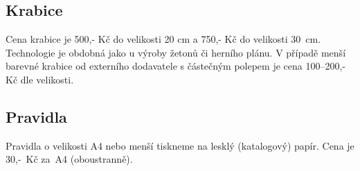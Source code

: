 \documentclass[14pt,a4paper]{extarticle}
\begin{document}
\subsection*{Krabice}
Cena krabice je 500,- Kč do velikosti 20 cm a 750,- Kč do velikosti 30~cm. Technologie je obdobná jako u výroby žetonů či herního plánu. V případě menší barevné krabice od externího dodavatele s částečným
polepem je cena 100--200,- Kč dle velikosti.
\subsection*{Pravidla}
Pravidla o velikosti A4 nebo menší tiskneme na lesklý (katalogový) papír. Cena je 30,-~Kč za~A4 (oboustranně).
\end{document}
